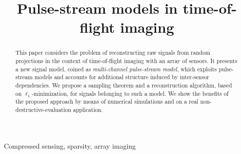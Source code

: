 \documentclass{article}
\theoremstyle{definition}
\begin{document}
\ninept
%
\title{Pulse-stream models in time-of-flight imaging}
%
%

\maketitle

\begin{abstract}
	This paper considers the problem of reconstructing raw signals from random projections in the context of time-of-flight imaging with an array of sensors. It presents a new signal model, coined as \textit{multi-channel pulse-stream model}, which exploits pulse-stream models and accounts for additional structure induced by inter-sensor dependencies. We propose a sampling theorem and a reconstruction algorithm, based on $\ell_1$-minimization, for signals belonging to such a model. We show the benefits of the proposed approach by means of numerical simulations and on a real non-destructive-evaluation application. 
\end{abstract}

\begin{keywords}
Compressed sensing, sparsity, array imaging
\end{keywords}






%
\maketitle
\end{document}
